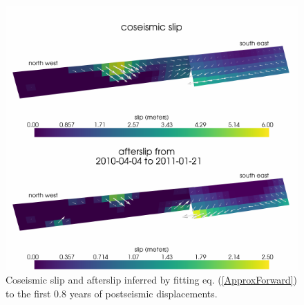 \documentclass[draft,linenumbers]{AGUJournal}
\begin{document}
\begin{figure}
\includegraphics[scale=0.9]{Figures/InitialSlip}
\caption{Coseismic slip and afterslip inferred by fitting eq. (\ref{ApproxForward}) to the first 0.8 years of postseismic displacements.}
\label{fig:InitialSlip}
\end{figure} 
\end{document}
